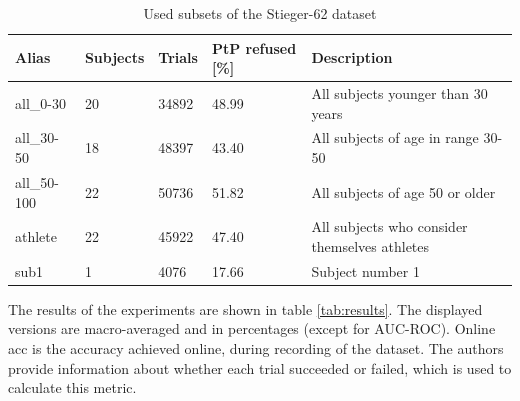 \documentclass[english, he, bc, kiv, iso690alph, viewonly]{fasthesis}
\begin{document}
\begin{table}
	\label{tab:subsets}
	\centering
	\caption{Used subsets of the Stieger-62 dataset}
	\begin{tabular}{*{4}{l}p{}}
		\toprule
		\textbf{Alias} & \textbf{Subjects} & \textbf{Trials} & \textbf{PtP refused [\%]} & \textbf{Description} \\
		\midrule
		all\_0-30 & 20 & 34892 & 48.99 & All subjects younger than 30 years\\
		all\_30-50 & 18 & 48397 & 43.40 & All subjects of age in range 30-50\\
		all\_50-100 & 22 & 50736 & 51.82 & All subjects of age 50 or older\\
		athlete & 22 & 45922 & 47.40 & All subjects who consider themselves athletes\\
		sub1 & 1 & 4076 & 17.66 & Subject number 1\\
		\bottomrule
	\end{tabular}
\end{table}

The results of the experiments are shown in table \ref{tab:results}. The displayed versions are macro-averaged and in percentages (except for AUC-ROC). Online acc is the accuracy achieved online, during recording of the dataset. The authors provide information about whether each trial succeeded or failed, which is used to calculate this metric.

\begin{table}
	\label{tab:results}
	\centering
	\caption{Model results}
\end{table}
\end{document}
